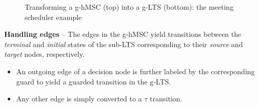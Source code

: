 \begin{figure}[H]
\centering
{}
\caption[Transforming a g-hMSC into a g-LTS: the meeting scheduler example]{Transforming a g-hMSC (top) into a g-LTS (bottom): the meeting scheduler example\label{image:scheduler-ghmsc-glts}}
\end{figure}

\noindent \textbf{Handling edges} -- The edges in the g-hMSC yield transitions between the \emph{terminal} and \emph{initial} states of the sub-LTS corresponding to their \emph{source} and \emph{target} nodes, respectively.
\begin{itemize}
\item An outgoing edge of a decision node is further labeled by the corresponding guard to yield a guarded transition in the g-LTS.
\item Any other edge is simply converted to a $\tau$ transition.
\end{itemize}

